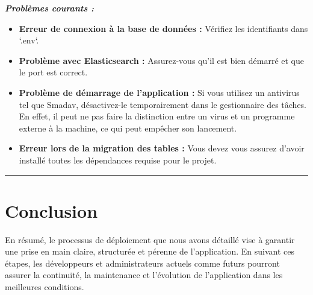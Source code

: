 \documentclass[12pt]{article}
\begin{document}
\newpage
{\fontsize{14}{16}\textbf{\textit{Problèmes courants :}}}

\begin{itemize}
    \item \textbf{Erreur de connexion à la base de données :} Vérifiez les identifiants dans `.env`.
    \item \textbf{Problème avec Elasticsearch :} Assurez-vous qu’il est bien démarré et que le port est correct.
    \item \textbf{Problème de démarrage de l'application :} Si vous utilisez un antivirus tel que Smadav, désactivez-le 
    temporairement dans le gestionnaire des tâches. En effet, il peut ne pas faire la distinction entre un virus et un 
    programme externe à la machine, ce qui peut empêcher son lancement.
    \item \textbf{Erreur lors de la migration des tables :} Vous devez vous assurez d'avoir installé toutes les dépendances
    requise pour le projet.
\end{itemize}
\rule{\linewidth}{0.2pt}

\newpage
{\fontsize{14}{16}\section*{Conclusion}}
En résumé, le processus de déploiement que nous avons détaillé vise à garantir une prise en main claire, structurée 
et pérenne de l'application. En suivant ces étapes, les développeurs et administrateurs actuels comme futurs pourront
assurer la continuité, la maintenance et l’évolution de l’application dans les meilleures conditions.
\end{document}
